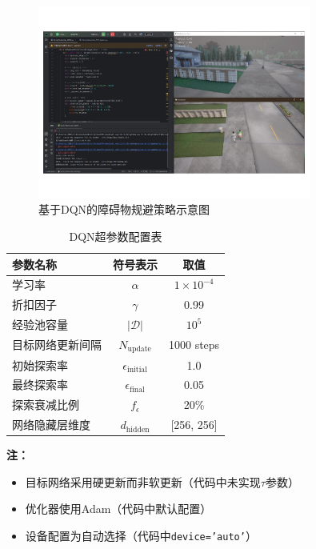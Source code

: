 \begin{figure}[H]
    \centering
    \includegraphics[width=0.8\textwidth]{images/pedestrian_avoidance.pdf}
    \caption{基于DQN的障碍物规避策略示意图}
    \label{fig:avoidance}
\end{figure}

\begin{table}[!ht]
    \centering
    \caption{DQN超参数配置表}
    \label{tab:dqn_params}
    \begin{tabular}{lcc}
        \toprule
        参数名称 & 符号表示 & 取值 \\
        \midrule
        学习率 & $\alpha$ & $1\times10^{-4}$ \\
        折扣因子 & $\gamma$ & 0.99 \\
        经验池容量 & $|\mathcal{D}|$ & $10^5$ \\
        目标网络更新间隔 & $N_{\text{update}}$ & 1000 steps \\
        初始探索率 & $\epsilon_{\text{initial}}$ & 1.0 \\
        最终探索率 & $\epsilon_{\text{final}}$ & 0.05 \\
        探索衰减比例 & $f_{\epsilon}$ & 20\% \\  %
        网络隐藏层维度 & $d_{\text{hidden}}$ & [256, 256] \\
        \bottomrule
    \end{tabular}
\end{table}

\noindent \textbf{注：}
\begin{itemize}
    \item 目标网络采用硬更新而非软更新（代码中未实现$\tau$参数）
    \item 优化器使用Adam（代码中默认配置）
    \item 设备配置为自动选择（代码中\texttt{device='auto'}）
\end{itemize}

